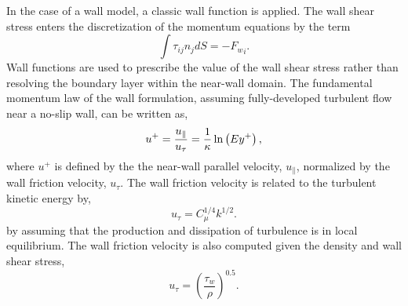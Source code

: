 In the case of a wall model, a classic wall function is applied.
The wall shear stress enters the discretization of the momentum equations 
by the term
%
\begin{equation}
        \int \tau_{ij} n_j dS = -{F_w}_i .
 \label{wall_shear1}
\end{equation}
%
Wall functions are used to prescribe the value of the wall shear 
stress rather than resolving the boundary layer within the near-wall 
domain. The fundamental momentum law of the wall formulation, assuming 
fully-developed turbulent flow near a no-slip wall, can be written as,
%
\begin{equation}
u^+ = {u_{\|} \over u_{\tau}} 
    = { 1 \over \kappa } \ln \left(Ey^+\right) ,
\label{law_wall}
\end{equation}
%
where $u^+$ is defined by the the near-wall parallel velocity, $u_{\|}$, normalized 
by the wall friction velocity, $u_{\tau}$. The wall friction velocity is
related to the turbulent kinetic energy by,
%
\begin{equation} 
        u_{\tau} = C_\mu^{1/4} k^{1/2}.
\label{utau}
\end{equation}
%
by assuming that the production and dissipation of turbulence is in local 
equilibrium.  The wall friction velocity is also computed given the density and wall shear stress,
\begin{equation} 
        u_\tau = (\frac{\tau_w} {\rho})^{0.5}.
\end{equation}


